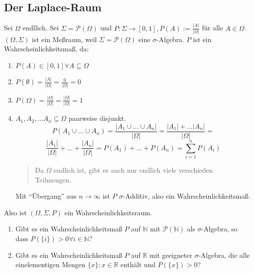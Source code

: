 \subsection{Der Laplace-Raum}
Sei $\Omega$ endllich. Sei $\Sigma = \mathcal P(\Omega)$ und $P: \Sigma \rightarrow [0,1], P(A):= \frac{\lvert A \rvert}{\lvert \Omega \rvert}$ für alle $A \in \Omega$. %
$(\Omega, \Sigma)$ ist ein Meßraum, weil $\Sigma = \mathcal P(\Omega)$ eine $\sigma$-Algebra.
$P$ ist ein Wahrscheinlichkeitsmaß, da:
\begin{enumerate}
 \item $P(A) \in [0,1] \forall A \subseteq \Omega$
 \item $P(\emptyset) = \frac{\lvert A \rvert}{\lvert \Omega \rvert} = \frac{0}{\lvert \Omega \rvert} = 0$
 \item $P(\Omega) = \frac{\lvert \Omega \rvert}{\lvert \Omega \rvert} = \frac{\lvert \Omega \rvert}{\lvert \Omega \rvert} = 1$
 \item $A_1,A_2,... A_n \subseteq \Omega$ paarweise disjunkt.
$$ P(A_1 \cup ... \cup A_n) = \frac{\lvert A_1 \cup ... \cup A_n \rvert}{\lvert \Omega \rvert} = \frac{\lvert A_1 \rvert + ... \lvert A_n \rvert}{\lvert \Omega \rvert} = $$
$$ \frac{\lvert A_1 \rvert}{\lvert \Omega \rvert} + ... +  \frac{\lvert A_n \rvert}{\lvert \Omega \rvert} = P(A_1) + ... + P(A_n) = \sum_{i=1}^n P(A_i) $$
\begin{quote}
 Da $\Omega$ endlich ist, gibt es auch nur endlich viele verschieden Teilmengen.
\end{quote}

Mit ``Übergang'' aus $n \rightarrow \infty$ ist $P$ $\sigma$-Additiv, also ein Wahrscheinlichkeitsmaß.
\end{enumerate}
Also ist $(\Omega,\Sigma,P)$ ein Wahrscheinlichkeitsraum.


\begin{enumerate}
 \item 
Gibt es ein Wahrscheinlichkeitsmaß $P$ auf $\mathbb N$ mit $\mathcal P(\mathbb N)$ als $\sigma$-Algebra, so dass $P(\{i\}) > 0 \forall i \in \mathbb N$?
 \item
Gibt es ein Wahrscheinlichkeitsmaß $P$ auf $\mathbb R$ mit geeigneter $\sigma$-Algebra, die alle einelementigen Mengen $\{x\}; x \in \mathbb R$ enthält und %
$P(\{x\}) > 0$?
\end{enumerate}
